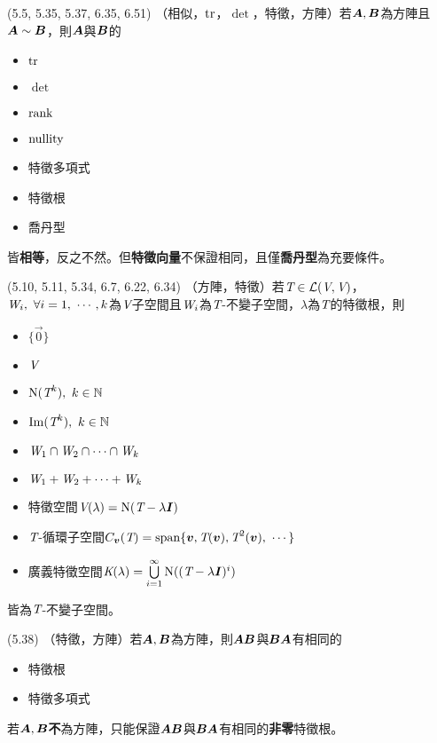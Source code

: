 \item \begin{theorem}{(5.5, 5.35, 5.37, 6.35, 6.51)} （相似，$\operatorname{tr}$，$\det$，特徵，方陣）若$\boldsymbol{A}, \boldsymbol{B}$為方陣且$\boldsymbol{A} \sim \boldsymbol{B}$，則$\boldsymbol{A}$與$\boldsymbol{B}$的
	\begin{itemize}
		\item $\operatorname{tr}$
		\item $\det$
		\item $\operatorname{rank}$
		\item $\operatorname{nullity}$
		\item 特徵多項式
		\item 特徵根
		\item 喬丹型
	\end{itemize}
	皆\textbf{相等}，反之不然。但\textbf{特徵向量}不保證相同，且僅\textbf{喬丹型}為充要條件。
\end{theorem}

\item \begin{theorem}{(5.10, 5.11, 5.34, 6.7, 6.22, 6.34)} （方陣，特徵）若$\textit{T} \in \mathcal{L}(\textit{V}, \textit{V})$，$\spc{W}_i, \ \forall i = 1, \ \cdots, k$為$\textit{V}$子空間且$\textit{W}_i$為$\textit{T}$-不變子空間，$\lambda$為$\textit{T}$的特徵根，則
	\begin{itemize}
		\item $\{\vec{0}\}$
		\item $\textit{V}$
		\item $\operatorname{N}(\textit{T}^k), \ k \in \mathbb{N}$
		\item $\operatorname{Im}(\textit{T}^k), \ k \in \mathbb{N}$
		\item $\textit{W}_1 \cap \textit{W}_2 \cap \cdots \cap \textit{W}_k$
		\item $\textit{W}_1 + \textit{W}_2 + \cdots + \textit{W}_k$
		\item 特徵空間$\textit{V}(\lambda) = \operatorname{N}(\textit{T} - \lambda\boldsymbol{I})$
		\item $\textit{T}$-循環子空間$C_{\boldsymbol{v}}(\textit{T}) = \operatorname{span}\{\boldsymbol{v}, \textit{T}(\boldsymbol{v}), \textit{T}^2(\boldsymbol{v}), \ \cdots\}$
		\item 廣義特徵空間$\textit{K}(\lambda) = \bigcup\limits_{i = 1}^{\infty}\operatorname{N}((\textit{T} - \lambda\boldsymbol{I})^i)$
	\end{itemize}
	皆為$\textit{T}$-不變子空間。
\end{theorem}

\item \begin{theorem}{(5.38)} （特徵，方陣）若$\boldsymbol{A}, \boldsymbol{B}$為方陣，則$\boldsymbol{AB}$與$\boldsymbol{BA}$有相同的
	\begin{itemize}
		\item 特徵根
		\item 特徵多項式
	\end{itemize}
	若$\boldsymbol{A}, \boldsymbol{B}$\textbf{不}為方陣，只能保證$\boldsymbol{AB}$與$\boldsymbol{BA}$有相同的\textbf{非零}特徵根。
\end{theorem}

